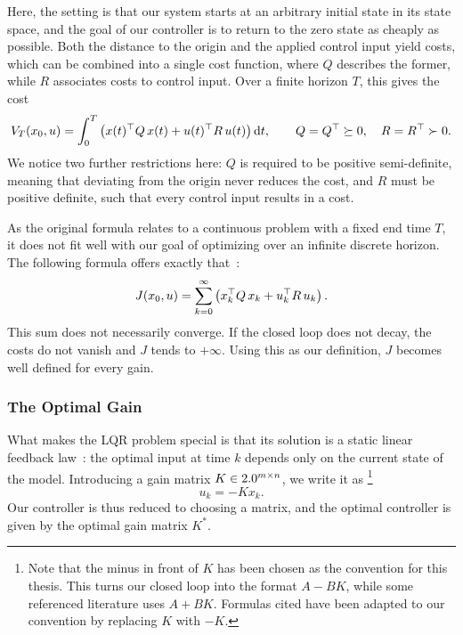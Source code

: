 Here, the setting is that our system starts at an arbitrary initial state in its
state space, and the goal of our controller is to return to the zero state as
cheaply as possible. Both the distance to the origin and the applied control
input yield costs, which can be combined into a single cost function, where $Q$
describes the former, while $R$
associates costs to control input. Over a finite horizon $T$, this gives the
cost~\cite[pp.~5--6, Eqs.~(1.3) and (1.5)]{Werner2021Optimal}
\begin{equation}
    \label{eq:lqr-cost-finite}
    V_T(x_0, u) = \int_{0}^{T} \left( x(t)^{\top} Q\, x(t) + u(t)^{\top} R\, u(t) \right) \mathrm{d}t ,
    \qquad Q = Q^{\top} \succeq 0, \quad R = R^{\top} \succ 0 .
\end{equation}
We notice two further restrictions here: $Q$ is required to be positive
semi-definite, meaning that deviating from the origin never reduces the cost,
and $R$ must be positive definite, such that every control input results in a cost.

As the original formula relates to a continuous problem with a fixed end time $T$,
it does not fit well with our goal of optimizing over an infinite discrete horizon.
The following formula offers exactly that~\cite[p.~137, Eq.~(7.30)]{Werner2021Control}:
\begin{equation}
    \label{eq:lqr-cost-infinite}
    J(x_0, u) = \sum_{k=0}^{\infty} \left( x_k^{\top} Q\, x_k + u_k^{\top} R\, u_k \right) .
\end{equation}
This sum does not necessarily converge. If the closed loop
does not decay, the costs do not vanish and $J$ tends to $+\infty$. 
Using this as our definition, $J$ becomes well defined for every gain.

\subsubsection{The Optimal Gain}
\label{subsubsec:lqr-optimal}

What makes the LQR problem special is that its solution is a static linear feedback
law~\cite[Sec.~4]{Recht2019Tour}: the optimal input at time $k$ depends only on the current state of the model.
Introducing a gain matrix $K \in 2.0^{m \times n}$, we write it as%
\footnote{Note that the minus in front of $K$ has been chosen as the convention for this thesis.
This turns our closed loop into the format $A - BK$, while some referenced literature
uses $A + BK$. Formulas cited have been adapted to our convention by replacing $K$ with $-K$.
}
\begin{equation}
    \label{eq:feedback-law}
    u_k = -K x_k .
\end{equation}
Our controller is thus reduced to choosing a matrix, and the
optimal controller is given by the optimal gain matrix $K^{*}$.

